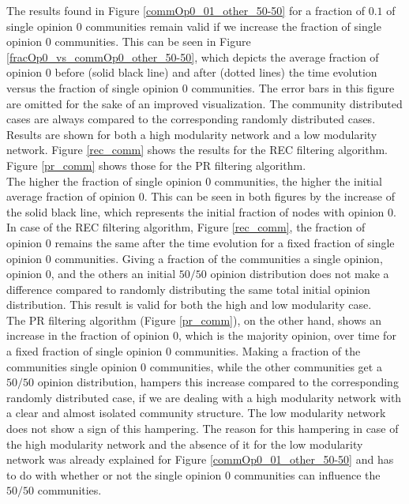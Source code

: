 \documentclass[11 pt , letterpaper , twoside , openright]{book}
\begin{document}
\noindent
The results found in Figure \ref{commOp0_01_other_50-50} for a fraction of $0.1$ of single opinion 0 communities remain valid if we increase the fraction of single opinion 0 communities. This can be seen in Figure \ref{fracOp0_vs_commOp0_other_50-50}, which depicts the average fraction of opinion 0 before (solid black line) and after (dotted lines) the time evolution versus the fraction of single opinion 0 communities. The error bars in this figure are omitted for the sake of an improved visualization. The community distributed cases are always compared to the corresponding randomly distributed cases. Results are shown for both a high modularity network and a low modularity network. Figure \ref{rec_comm} shows the results for the REC filtering algorithm. Figure \ref{pr_comm} shows those for the PR filtering algorithm.\\
The higher the fraction of single opinion 0 communities, the higher the initial average fraction of opinion 0. This can be seen in both figures by the increase of the solid black line, which represents the initial fraction of nodes with opinion 0. In case of the REC filtering algorithm, Figure \ref{rec_comm}, the fraction of opinion 0 remains the same after the time evolution for a fixed fraction of single opinion 0 communities. Giving a fraction of the communities a single opinion, opinion 0, and the others an initial $50/50$ opinion distribution does not make a difference compared to randomly distributing the same total initial opinion distribution. This result is valid for both the high and low modularity case.\\
The PR filtering algorithm (Figure \ref{pr_comm}), on the other hand, shows an increase in the fraction of opinion 0, which is the majority opinion, over time for a fixed fraction of single opinion 0 communities. Making a fraction of the communities single opinion 0 communities, while the other communities get a $50/50$ opinion distribution, hampers this increase compared to the corresponding randomly distributed case, if we are dealing with a high modularity network with a clear and almost isolated community structure. The low modularity network does not show a sign of this hampering. The reason for this hampering in case of the high modularity network and the absence of it for the low modularity network was already explained for Figure \ref{commOp0_01_other_50-50} and has to do with whether or not the single opinion 0 communities can influence the $50/50$ communities. 
\end{document}
